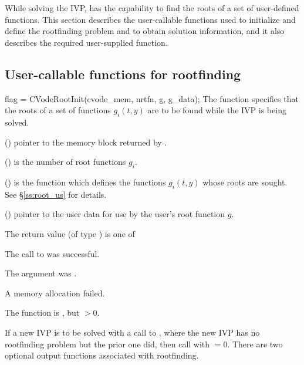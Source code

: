 While solving the IVP, {\cvodes} has the capability to find the
roots of a set of user-defined functions. This section describes the
user-callable functions used to initialize and define the rootfinding
problem and to obtain solution information, and it also describes the
required user-supplied function.

\subsection{User-callable functions for rootfinding}\label{ss:root_uc}

{
  flag = CVodeRootInit(cvode\_mem, nrtfn, g, g\_data);
}
{
  The function  specifies that the roots of a set of
  functions $g_i(t,y)$ are to be found while the IVP is being solved.
}
{
  \begin{args}
  \item[cvode\_mem] ()
    pointer to the {\cvodes} memory block returned by .
  \item[nrtfn] ()
    is the number of root functions $g_i$.
  \item[g] ()
    is the {\C} function which defines the  functions $g_i(t,y)$
    whose roots are sought. See \S\ref{ss:root_us} for details.
  \item[g\_data] ()
    pointer to the user data for use by the user's root function $g$.
 \end{args}
}
{
  The return value  (of type ) is one of
  \begin{args}
  \item[CV\_SUCCESS]
    The call to  was successful.
  \item[CV\_MEM\_NULL]
    The  argument was .
  \item[CV\_MEM\_FAIL]
    A memory allocation failed.
  \item[CV\_RTFUNC\_NULL]
    The function  is , but $>0$.
  \end{args}
}
{
  If a new IVP is to be solved with a call to , where the new
  IVP has no rootfinding problem but the prior one did, then call
   with $=0$.
}
There are two optional output functions associated with rootfinding.
